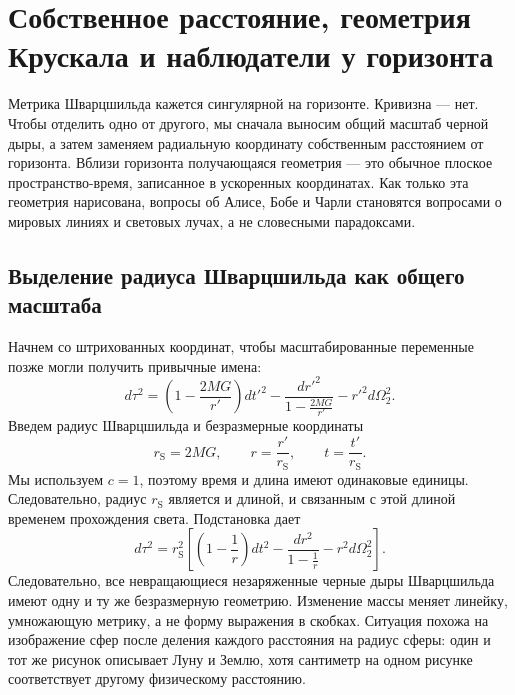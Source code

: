 \chapter{Собственное расстояние, геометрия Крускала и наблюдатели у горизонта}

Метрика Шварцшильда кажется сингулярной на горизонте. Кривизна — нет. Чтобы отделить одно от другого, мы сначала выносим общий масштаб черной дыры, а затем заменяем радиальную координату собственным расстоянием от горизонта. Вблизи горизонта получающаяся геометрия — это обычное плоское пространство-время, записанное в ускоренных координатах. Как только эта геометрия нарисована, вопросы об Алисе, Бобе и Чарли становятся вопросами о мировых линиях и световых лучах, а не словесными парадоксами.

\section{Выделение радиуса Шварцшильда как общего масштаба}

Начнем со штрихованных координат, чтобы масштабированные переменные позже могли получить привычные имена:
\begin{equation}
d\tau^2
=
\left(1-\frac{2MG}{r'}\right)dt'^2
-
\frac{dr'^2}{1-\frac{2MG}{r'}}
-
r'^2d\Omega_2^2.
\label{eq:l7-schwarzschild-dimensional}
\end{equation}
Введем радиус Шварцшильда и безразмерные координаты
\begin{equation}
r_{\mathrm S}=2MG,
\qquad
r=\frac{r'}{r_{\mathrm S}},
\qquad
t=\frac{t'}{r_{\mathrm S}}.
\label{eq:l7-rescaling}
\end{equation}
Мы используем \(c=1\), поэтому время и длина имеют одинаковые единицы. Следовательно, радиус
\(r_{\mathrm S}\) является и длиной, и связанным с этой длиной временем прохождения света. Подстановка дает
\begin{equation}
d\tau^2
=r_{\mathrm S}^2
\left[
\left(1-\frac1r\right)dt^2
-
\frac{dr^2}{1-\frac1r}
-
r^2d\Omega_2^2
\right].
\label{eq:l7-schwarzschild-rescaled}
\end{equation}
Следовательно, все невращающиеся незаряженные черные дыры Шварцшильда имеют одну и ту же безразмерную геометрию. Изменение массы меняет линейку, умножающую метрику, а не форму выражения в скобках. Ситуация похожа на изображение сфер после деления каждого расстояния на радиус сферы: один и тот же рисунок описывает Луну и Землю, хотя сантиметр на одном рисунке соответствует другому физическому расстоянию.

